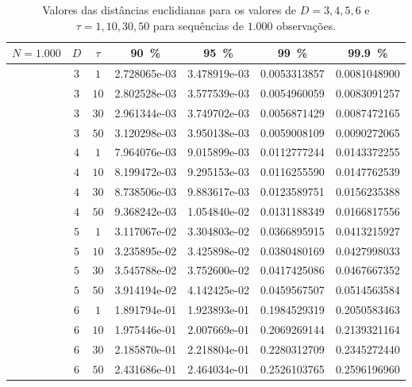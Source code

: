 \begin{table}[hbt]
	\centering
	\caption{Valores das distâncias euclidianas para os valores de $D= 3, 4, 5, 6$ e $\tau=1, 10, 30, 50$ para sequências de $1.000$ observações.}\label{tab:dEuclid_1000}
	\begin{tabular}{ccccccc}
	\toprule
$N=1.000$	&  $D$  &$\tau$  &\SI{90}{\percent}&\SI{95}{\percent}&\SI{99}{\percent}&\SI{99.9}{\percent}\\
\midrule
			&  $3$ &  $ 1$ & 2.728065e-03  &  3.478919e-03  &  0.0053313857  &  0.0081048900 \\ 
			&  $3$ &  $10$ & 2.802528e-03  &  3.577539e-03  &  0.0054960059  &  0.0083091257 \\
			&  $3$ &  $30$ & 2.961344e-03  &  3.749702e-03  &  0.0056871429  &  0.0087472165 \\
			&  $3$ &  $50$ & 3.120298e-03  &  3.950138e-03  &  0.0059008109  &  0.0090272065 \\
\midrule
			&  $4$ &  $ 1$ & 7.964076e-03  &  9.015899e-03  &  0.0112777244  &  0.0143372255 \\ 
			&  $4$ &  $10$ & 8.199472e-03  &  9.295153e-03  &  0.0116255590  &  0.0147762539 \\
			&  $4$ &  $30$ & 8.738506e-03  &  9.883617e-03  &  0.0123589751  &  0.0156235388 \\
			&  $4$ &  $50$ & 9.368242e-03  &  1.054840e-02  &  0.0131188349  &  0.0166817556 \\
\midrule
			&  $5$ &  $ 1$ & 3.117067e-02  &  3.304803e-02  &  0.0366895915  &  0.0413215927 \\ 
			&  $5$ &  $10$ & 3.235895e-02  &  3.425898e-02  &  0.0380480169  &  0.0427998033 \\
			&  $5$ &  $30$ & 3.545788e-02  &  3.752600e-02  &  0.0417425086  &  0.0467667352 \\
			&  $5$ &  $50$ & 3.914194e-02  &  4.142425e-02  &  0.0459567507  &  0.0514563584 \\
\midrule
			&  $6$ &  $ 1$ & 1.891794e-01  &  1.923893e-01  &  0.1984529319  &  0.2050583463 \\
			&  $6$ &  $10$ & 1.975446e-01  &  2.007669e-01  &  0.2069269144  &  0.2139321164 \\
			&  $6$ &  $30$ & 2.185870e-01  &  2.218804e-01  &  0.2280312709  &  0.2345272440 \\
			&  $6$ &  $50$ & 2.431686e-01  &  2.464034e-01  &  0.2526103765  &  0.2596196960 \\
	\bottomrule
\end{tabular}
\end{table}

